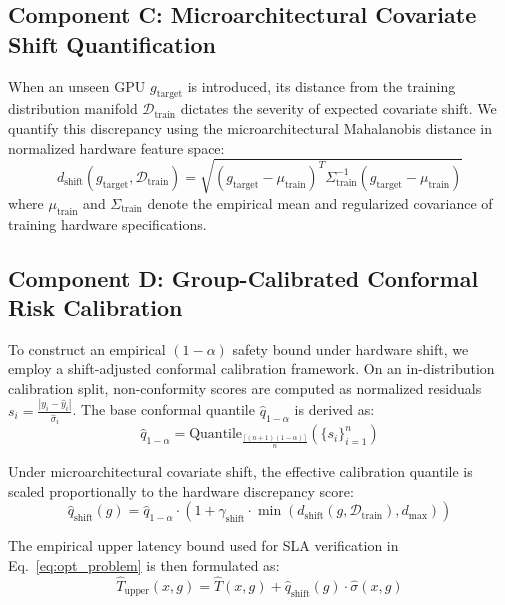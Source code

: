 \documentclass[preprint,12pt]{elsarticle}
\begin{document}
\subsection{Component C: Microarchitectural Covariate Shift Quantification}
When an unseen GPU $g_{\text{target}}$ is introduced, its distance from the training distribution manifold $\mathcal{D}_{\text{train}}$ dictates the severity of expected covariate shift. We quantify this discrepancy using the microarchitectural Mahalanobis distance in normalized hardware feature space:
\begin{equation}
\label{eq:mahalanobis}
d_{\text{shift}}(g_{\text{target}}, \mathcal{D}_{\text{train}}) = \sqrt{(g_{\text{target}} - \mu_{\text{train}})^T \Sigma_{\text{train}}^{-1} (g_{\text{target}} - \mu_{\text{train}})}
\end{equation}
where $\mu_{\text{train}}$ and $\Sigma_{\text{train}}$ denote the empirical mean and regularized covariance of training hardware specifications.

\subsection{Component D: Group-Calibrated Conformal Risk Calibration}
To construct an empirical $(1-\alpha)$ safety bound under hardware shift, we employ a shift-adjusted conformal calibration framework. On an in-distribution calibration split, non-conformity scores are computed as normalized residuals $s_i = \frac{|y_i - \hat{y}_i|}{\hat{\sigma}_i}$. The base conformal quantile $\hat{q}_{1-\alpha}$ is derived as:
\begin{equation}
\hat{q}_{1-\alpha} = \text{Quantile}_{\frac{\lceil (n+1)(1-\alpha) \rceil}{n}}\left(\{s_i\}_{i=1}^n\right)
\end{equation}

Under microarchitectural covariate shift, the effective calibration quantile is scaled proportionally to the hardware discrepancy score:
\begin{equation}
\hat{q}_{\text{shift}}(g) = \hat{q}_{1-\alpha} \cdot \left(1 + \gamma_{\text{shift}} \cdot \min\left(d_{\text{shift}}(g, \mathcal{D}_{\text{train}}), d_{\max}\right)\right)
\end{equation}

The empirical upper latency bound used for SLA verification in Eq.~\eqref{eq:opt_problem} is then formulated as:
\begin{equation}
\hat{T}_{\text{upper}}(x, g) = \hat{T}(x, g) + \hat{q}_{\text{shift}}(g) \cdot \hat{\sigma}(x, g)
\end{equation}
\end{document}
